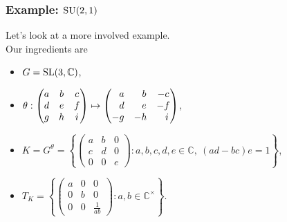 \documentclass{beamer}
\begin{document}
\begin{frame}
\frametitle{Example: $\textup{SU}(2, 1)$}
Let's look at a more involved example.\\[2ex]
Our ingredients are
\begin{itemize}
\item $G = \textup{SL}(3, \mathbb{C})$,
\item $\theta : \begin{pmatrix}a&b&c\\d&e&f\\g&h&i\end{pmatrix} \mapsto \begin{pmatrix}\hphantom{-}a&\hphantom{-}b&-c\\\hphantom{-}d&\hphantom{-}e&-f\\-g&-h&\hphantom{-}i\end{pmatrix}$,
\item $K = G^\theta = \left\{\!\begin{pmatrix}a&b&0\\c&d&0\\0&0&e\end{pmatrix} : a, b, c, d, e \in \mathbb{C},\ (ad - bc)e = 1\right\}$,
\item $T_K = \left\{\!\begin{pmatrix}a&0&0\\0&b&0\\0&0&\frac{1}{ab}\end{pmatrix} : a, b \in \mathbb{C}^\times\right\}$.\\[2ex]
\end{itemize}
\end{frame}
\end{document}
